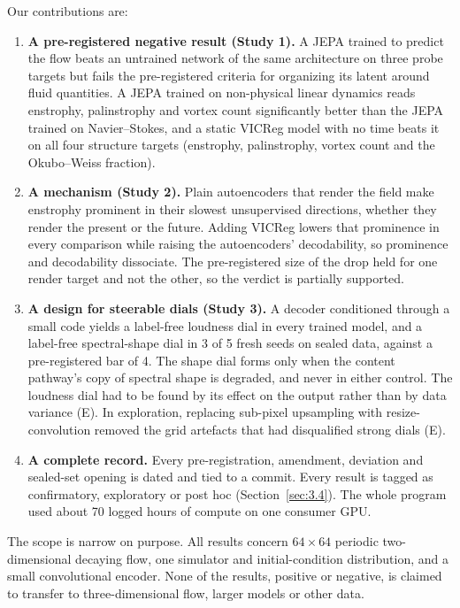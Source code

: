 \documentclass[10pt]{article}
\begin{document}
Our contributions are:

\begin{enumerate}
\item \textbf{A pre-registered negative result (Study 1).} A JEPA trained to predict the flow beats an untrained network of the same architecture on three probe targets but fails the pre-registered criteria for organizing its latent around fluid quantities. A JEPA trained on non-physical linear dynamics reads enstrophy, palinstrophy and vortex count significantly better than the JEPA trained on Navier--Stokes, and a static VICReg model with no time beats it on all four structure targets (enstrophy, palinstrophy, vortex count and the Okubo--Weiss fraction).
\item \textbf{A mechanism (Study 2).} Plain autoencoders that render the field make enstrophy prominent in their slowest unsupervised directions, whether they render the present or the future. Adding VICReg lowers that prominence in every comparison while raising the autoencoders' decodability, so prominence and decodability dissociate. The pre-registered size of the drop held for one render target and not the other, so the verdict is partially supported.
\item \textbf{A design for steerable dials (Study 3).} A decoder conditioned through a small code yields a label-free loudness dial in every trained model, and a label-free spectral-shape dial in 3 of 5 fresh seeds on sealed data, against a pre-registered bar of 4. The shape dial forms only when the content pathway's copy of spectral shape is degraded, and never in either control. The loudness dial had to be found by its effect on the output rather than by data variance (E). In exploration, replacing sub-pixel upsampling with resize-convolution removed the grid artefacts that had disqualified strong dials (E).
\item \textbf{A complete record.} Every pre-registration, amendment, deviation and sealed-set opening is dated and tied to a commit. Every result is tagged as confirmatory, exploratory or post hoc (Section~\ref{sec:3.4}). The whole program used about 70 logged hours of compute on one consumer GPU.
\end{enumerate}

The scope is narrow on purpose. All results concern $64 \times 64$ periodic two-dimensional decaying flow, one simulator and initial-condition distribution, and a small convolutional encoder. None of the results, positive or negative, is claimed to transfer to three-dimensional flow, larger models or other data.
\end{document}
